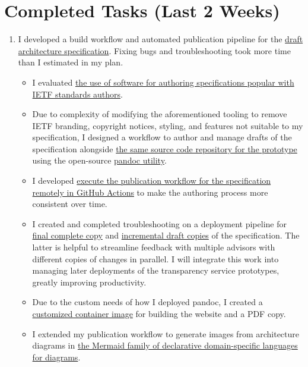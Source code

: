 \documentclass{jdf}
\begin{document}
\section*{Completed Tasks (Last 2 Weeks)}

\begin{enumerate}
    \item I developed a build workflow and automated publication pipeline for the \hyperlink{https://add-architecture-draft--conmotion.netlify.app/architecture.html}{draft architecture specification}. Fixing bugs and troubleshooting took more time than I estimated in my plan.
        \begin{itemize}
            \item I evaluated \hyperlink{https://github.com/martinthomson/i-d-template}{the use of software for authoring specifications popular with IETF standards authors}.
            \item Due to complexity of modifying the aforementioned tooling to remove IETF branding, copyright notices, styling, and features not suitable to my specification, I designed a workflow to author and manage drafts of the specification alongside \hyperlink{https://github.com/aj-stein/conmotion/}{the same source code repository for the prototype} using the open-source \hyperlink{https://pandoc.org/}{pandoc utility}.
            \item I developed \hyperlink{https://github.com/aj-stein/conmotion/blob/develop/.github/workflows/cd.yml}{execute the publication workflow for the specification remotely in GitHub Actions} to make the authoring process more consistent over time.
            \item I created and completed troubleshooting on a deployment pipeline for \hyperlink{https://aj-stein.github.io/conmotion/}{final complete copy} and \hyperlink{https://conmotion.netlify.app/}{incremental draft copies} of the specification. The latter is helpful to streamline feedback with multiple advisors with different copies of changes in parallel. I will integrate this work into managing later deployments of the transparency service prototypes, greatly improving productivity. 
            \item Due to the custom needs of how I deployed pandoc, I created a \hyperlink{https://github.com/users/aj-stein/packages/container/package/pandoc\%2Flatex}{customized container image} for building the website and a PDF copy.
            \item I extended my publication workflow to generate images from architecture diagrams in \hyperlink{https://mermaid.js.org/}{the Mermaid family of declarative domain-specific languages for diagrams}.

\end{itemize}
\end{enumerate}
\end{document}
